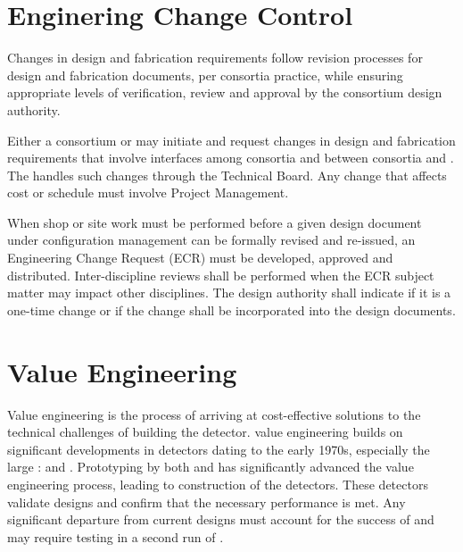 \section{Enginering Change Control}
\label{sec:fdsp-change}

Changes in design and fabrication requirements follow revision processes
for design and fabrication documents, per  consortia practice,  while
ensuring appropriate levels of verification, review and approval %
by the consortium %
design authority.


Either a consortium or  may initiate and request changes in design and fabrication requirements that involve
interfaces among consortia and between consortia and .  The 
handles such changes through the Technical Board. Any change that
affects cost or schedule must involve Project Management.

When shop or site work must be performed before a given %
design
document under configuration management can be formally revised and re-issued, %
an Engineering Change Request (ECR) must be developed, approved and distributed. %
Inter-discipline reviews shall be
performed when the ECR subject matter may impact other
disciplines.  The design authority shall indicate if it is a one-time
change or if the change shall be incorporated into the design
documents. 



\section{Value Engineering}
\label{sec:fdsp-coord-ve}

Value engineering is the process of arriving at cost-effective
solutions to the technical challenges of building the 
detector.  value engineering builds on significant
developments in  detectors dating to the early 1970s,
especially the large :  and
. Prototyping by both  and  has
significantly advanced the value engineering process, leading to
construction of the  detectors. These detectors validate
 designs and confirm that the necessary performance is
met. Any significant departure from current designs must account for
the success of   and may require testing in a second
run of .  

